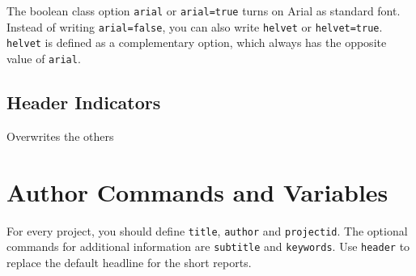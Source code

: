 \documentclass[short,comm,dots]{ipureport}
\begin{document}
The boolean class option \texttt{arial} or \texttt{arial=true} turns on Arial as standard font. Instead of writing \texttt{arial=false}, you can also write \texttt{helvet} or \texttt{helvet=true}. \texttt{helvet} is defined as a complementary option, which always has the opposite value of \texttt{arial}. 

\subsection{Header Indicators}
%
%
%
 Overwrites the others
%
\section{Author Commands and Variables}

For every project, you should define \texttt{title}, \texttt{author} and \texttt{projectid}. The optional 
commands for additional information are \texttt{subtitle} and \texttt{keywords}. Use \texttt{header} to replace the default 
headline for the short reports. 



\blinddocument
{}
\blindmathpaper

\end{document}
